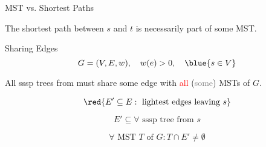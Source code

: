 
\begin{frame}{}
  \centerline{}
\end{frame}

\begin{frame}{}
  \begin{exampleblock}{MST vs. Shortest Paths }
    \centerline{\xmark\; The shortest path between $s$ and $t$ is necessarily part of some MST.}
  \end{exampleblock}

\end{frame}

\begin{frame}{}
  \begin{exampleblock}{Sharing Edges }
    \[
      G = (V, E, w), \quad w(e) > 0, \quad \blue{s \in V}
    \]

    \centerline{All sssp trees from  must share some edge with \textcolor{red}{all} {\small (\textcolor{gray}{some})} MSTs of $G$.}
  \end{exampleblock}

  \pause
  \[
    \red{E' \subseteq E: \text{ lightest edges leaving } s}
  \]

  \pause
  \[
    E' \subseteq \forall \text{ sssp tree from } s
  \]

  \pause
  \[
    \forall \text{ MST } T \text{ of } G: T \cap E' \neq \emptyset
  \]
\end{frame}
